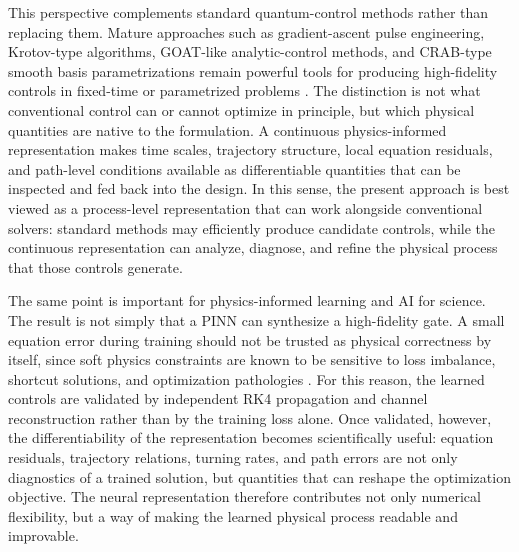 \documentclass[aps,prx,reprint,superscriptaddress,nofootinbib,longbibliography,floatfix,showkeys]{revtex4-2}
\begin{document}
This perspective complements standard quantum-control methods rather than
replacing them.  Mature approaches such as gradient-ascent pulse
engineering, Krotov-type algorithms, GOAT-like analytic-control methods,
and CRAB-type smooth basis parametrizations remain powerful tools for
producing high-fidelity controls in fixed-time or parametrized problems
\cite{Khaneja2005GRAPE,Palao2003KrotovUnitary,Goerz2019KrotovPackage,Brif2010QuantumControlReview,Glaser2015TrainingCat,Machnes2018GOAT,Caneva2011CRAB,Koch2022QuantumTechnologies}.
The distinction is not what conventional control can or cannot optimize in
principle, but which physical quantities are native to the formulation.  A
continuous physics-informed representation makes time scales, trajectory
structure, local equation residuals, and path-level conditions available as
differentiable quantities that can be inspected and fed back into the
design.  In this sense, the present approach is best viewed as a
process-level representation that can work alongside conventional solvers:
standard methods may efficiently produce candidate controls, while the
continuous representation can analyze, diagnose, and refine the physical
process that those controls generate.

The same point is important for physics-informed learning and AI for
science.  The result is not simply that a PINN can synthesize a
high-fidelity gate.  A small equation error during training should not be
trusted as physical correctness by itself, since soft physics constraints
are known to be sensitive to loss imbalance, shortcut solutions, and
optimization pathologies
\cite{Karniadakis2021PIML,Cuomo2022PINNReview,Wang2021GradientPathologies,Krishnapriyan2021FailureModes}.
For this reason, the learned controls are validated by independent RK4
propagation and channel reconstruction rather than by the training loss
alone.  Once validated, however, the differentiability of the representation
becomes scientifically useful: equation residuals, trajectory relations,
turning rates, and path errors are not only diagnostics of a trained
solution, but quantities that can reshape the optimization objective.  The
neural representation therefore contributes not only numerical flexibility,
but a way of making the learned physical process readable and improvable.
\end{document}

